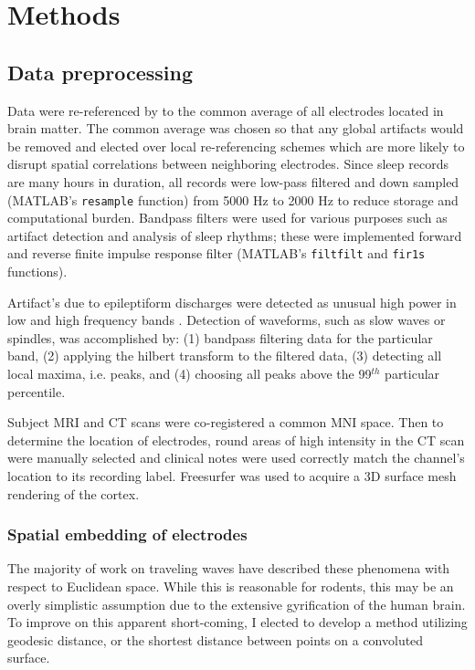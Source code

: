 \section*{Methods}
\subsection*{Data preprocessing}
Data were re-referenced by to the common average of all electrodes located in brain matter. The common average was chosen so that any global artifacts would be removed and elected over local re-referencing schemes which are more likely to disrupt spatial correlations between neighboring electrodes. Since sleep records are many hours in duration, all records were low-pass filtered and down sampled (\textsf{MATLAB's} \texttt{resample} function) from 5000 Hz to 2000 Hz to reduce storage and computational burden. Bandpass filters were used for various purposes such as artifact detection and analysis of sleep rhythms; these were implemented forward and reverse finite impulse response filter (\textsf{MATLAB's} \texttt{filtfilt} and \texttt{fir1s} functions).

Artifact's due to epileptiform discharges were detected as unusual high power in low and high frequency bands \citep[see]{Gelinas2016}. Detection of waveforms, such as slow waves or spindles, was accomplished by: (1) bandpass filtering data for the particular band, (2) applying the hilbert transform to the filtered data, (3) detecting all local maxima, i.e. peaks, and (4) choosing all peaks above the 99$^{th}$ particular percentile.

Subject MRI and CT scans were co-registered a common MNI space. Then to determine the location of electrodes, round areas of high intensity in the CT scan were manually selected and clinical notes were used correctly match the channel's location to its recording label. Freesurfer was used to acquire a 3D surface mesh rendering of the cortex.  

\subsubsection*{Spatial embedding of electrodes}
The majority of work on traveling waves have described these phenomena with respect to Euclidean space. While this is reasonable for rodents, this may be an overly simplistic assumption due to the extensive gyrification of the human brain. To improve on this apparent short-coming, I elected to develop a method utilizing geodesic distance, or the shortest distance between points on a convoluted surface.

